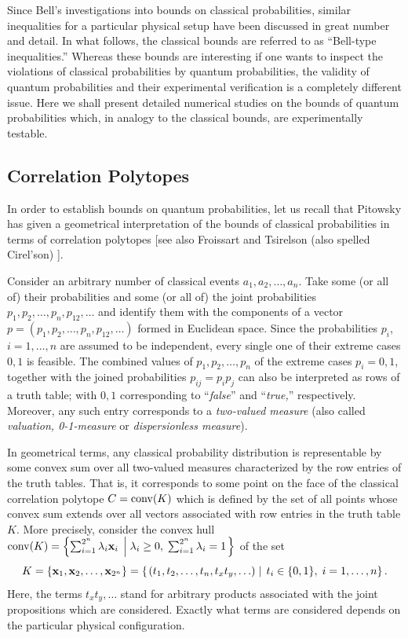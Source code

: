 Since Bell's investigations \cite{bell-87,clauser,peres} into bounds on classical probabilities,
similar inequalities for a particular physical setup have
been discussed in great number and detail.
In what follows, the classical bounds are referred to as ``Bell-type inequalities.''
Whereas these bounds are interesting
if one wants to inspect
the violations of classical probabilities by quantum probabilities,
the validity of quantum probabilities and their experimental verification is a completely
different issue.
Here we shall present detailed numerical studies on the bounds of quantum probabilities which,
in analogy to the classical bounds, are experimentally testable.

\subsection{Correlation Polytopes}

In order to establish bounds on quantum probabilities, let us recall that
Pitowsky has given a geometrical interpretation of the bounds of classical probabilities
in terms of correlation polytopes \cite{pitowsky-86,pitowsky,pitowsky-89a,Pit-91,Pit-94}
[see also Froissart \cite{froissart-81} and
Tsirelson (also spelled Cirel'son) \cite{cirelson:80,cirelson}].

Consider an arbitrary number of classical events $a_1, a_2,\ldots , a_n$.
Take some (or all of) their probabilities
and some (or all of) the joint probabilities
$p_1, p_2,\ldots , p_n, p_{12},\ldots $
and identify them with the components of
a vector  $p=(p_1, p_2,\ldots , p_n, p_{12},\ldots )$
formed in Euclidean space.
Since the probabilities $p_i$, $i=1,\ldots ,n$ are assumed to be independent,
every single one of their extreme cases $0,1$ is feasible.
The combined values of $p_1, p_2,\ldots , p_n$ of the extreme cases $p_i=0,1$,
together with the joined probabilities $p_{ij} =p_i p_j$
can also be interpreted as rows of a truth table; with $0,1$ corresponding to
``{\it false}'' and
``{\it true,}'' respectively.
Moreover, any such entry corresponds to a {\em two-valued measure}
(also called {\em valuation, 0-1-measure} or {\em dispersionless measure}).

In geometrical terms,
any classical probability distribution is representable by some convex sum over
all two-valued measures characterized by the row entries of the truth tables.
That is, it corresponds to
some point on the face of the classical correlation polytope $C={\rm conv} (K)$
which is defined by the set of all points whose
convex sum extends over all vectors associated with row entries in the truth table $K$.
More precisely,
consider the convex hull
${\rm conv} (K)=\left\{ \sum_{i=1}^{2^n} \lambda_i{\bf x}_i
  \; \left|  \;
\lambda_i\ge 0,\; \sum_{i=1}^{2^n}\lambda_i =1
\right.
\right\} $
of the set
$$K
=\{{\bf x}_1,{\bf x}_2,\ldots ,{\bf x}_{2^n}\}
= \left\{
\left.
\large(t_1, t_2,\ldots , t_n, t_xt_y,\ldots \large)
\; \right| \;
t_i \in \{0,1\},\; i=1,\ldots ,n
\right\}.$$
Here, the terms $t_xt_y,\ldots$ stand for arbitrary products associated with
the joint propositions which are considered. Exactly what terms  are
considered depends on the particular physical configuration.

